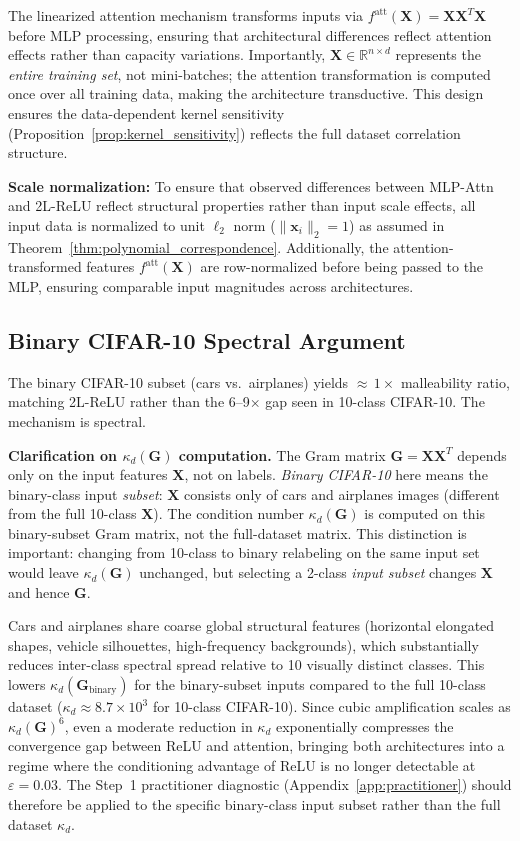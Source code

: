 \documentclass{article}
\theoremstyle{plain}
\theoremstyle{definition}
\theoremstyle{remark}
\newcommand{\R}{\mathbb{R}}
\begin{document}
The linearized attention mechanism transforms inputs via $f^{\text{att}}(\mathbf{X}) = \mathbf{X}\mathbf{X}^T\mathbf{X}$ before MLP processing, ensuring that architectural differences reflect attention effects rather than capacity variations. Importantly, $\mathbf{X} \in \R^{n \times d}$ represents the \emph{entire training set}, not mini-batches; the attention transformation is computed once over all training data, making the architecture transductive. This design ensures the data-dependent kernel sensitivity (Proposition~\ref{prop:kernel_sensitivity}) reflects the full dataset correlation structure.

\textbf{Scale normalization:} To ensure that observed differences between MLP-Attn and 2L-ReLU reflect structural properties rather than input scale effects, all input data is normalized to unit $\ell_2$ norm ($\|\mathbf{x}_i\|_2 = 1$) as assumed in Theorem~\ref{thm:polynomial_correspondence}. Additionally, the attention-transformed features $f^{\text{att}}(\mathbf{X})$ are row-normalized before being passed to the MLP, ensuring comparable input magnitudes across architectures.

\subsection{Binary CIFAR-10 Spectral Argument}
\label{app:binary_cifar}

The binary CIFAR-10 subset (cars vs.\ airplanes) yields ${\approx}\,1\times$ malleability ratio, matching 2L-ReLU rather than the 6--9$\times$ gap seen in 10-class CIFAR-10. The mechanism is spectral.

\textbf{Clarification on $\kappa_d(\mathbf{G})$ computation.} The Gram matrix $\mathbf{G} = \mathbf{X}\mathbf{X}^T$ depends only on the input features $\mathbf{X}$, not on labels. \emph{Binary CIFAR-10} here means the binary-class input \emph{subset}: $\mathbf{X}$ consists only of cars and airplanes images (different from the full 10-class $\mathbf{X}$). The condition number $\kappa_d(\mathbf{G})$ is computed on this binary-subset Gram matrix, not the full-dataset matrix. This distinction is important: changing from 10-class to binary relabeling on the same input set would leave $\kappa_d(\mathbf{G})$ unchanged, but selecting a 2-class \emph{input subset} changes $\mathbf{X}$ and hence $\mathbf{G}$.

Cars and airplanes share coarse global structural features (horizontal elongated shapes, vehicle silhouettes, high-frequency backgrounds), which substantially reduces inter-class spectral spread relative to 10 visually distinct classes. This lowers $\kappa_d(\mathbf{G}_{\text{binary}})$ for the binary-subset inputs compared to the full 10-class dataset ($\kappa_d \approx 8.7\times10^3$ for 10-class CIFAR-10). Since cubic amplification scales as $\kappa_d(\mathbf{G})^6$, even a moderate reduction in $\kappa_d$ exponentially compresses the convergence gap between ReLU and attention, bringing both architectures into a regime where the conditioning advantage of ReLU is no longer detectable at $\varepsilon = 0.03$. The Step~1 practitioner diagnostic (Appendix~\ref{app:practitioner}) should therefore be applied to the specific binary-class input subset rather than the full dataset $\kappa_d$.
\end{document}
